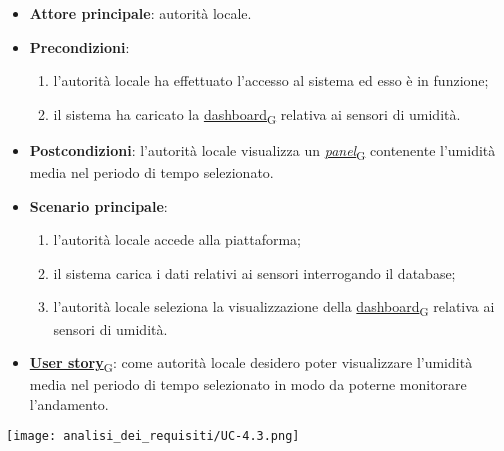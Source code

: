 \begin{itemize}
	\item \textbf{Attore principale}: autorità locale.
	\item \textbf{Precondizioni}:
	      \begin{enumerate}
		      \item l'autorità locale ha effettuato l'accesso al sistema ed esso è in funzione;
		      \item il sistema ha caricato la \href{https://7last.github.io/docs/rtb/documentazione-interna/glossario\#dashboard}{dashboard\textsubscript{G}} relativa ai sensori di umidità.
	      \end{enumerate}
	\item \textbf{Postcondizioni}: l'autorità locale visualizza un \href{https://7last.github.io/docs/rtb/documentazione-interna/glossario\#panel}{\textit{panel}\textsubscript{G}} contenente l'umidità media nel periodo di tempo selezionato.
	\item \textbf{Scenario principale}:
	      \begin{enumerate}
		      \item l'autorità locale accede alla piattaforma;
		      \item il sistema carica i dati relativi ai sensori interrogando il database;
		      \item l'autorità locale seleziona la visualizzazione della \href{https://7last.github.io/docs/rtb/documentazione-interna/glossario\#dashboard}{dashboard\textsubscript{G}} relativa ai sensori di umidità.
	      \end{enumerate}
	\item \href{https://7last.github.io/docs/rtb/documentazione-interna/glossario\#user-story}{\textbf{User story}\textsubscript{G}}: come autorità locale desidero poter visualizzare l'umidità media nel periodo di tempo selezionato
	      in modo da poterne monitorare l'andamento.
\end{itemize}
\begin{center}
	\texttt{[image: analisi\_dei\_requisiti/UC-4.3.png]}
\end{center}

\newpage

